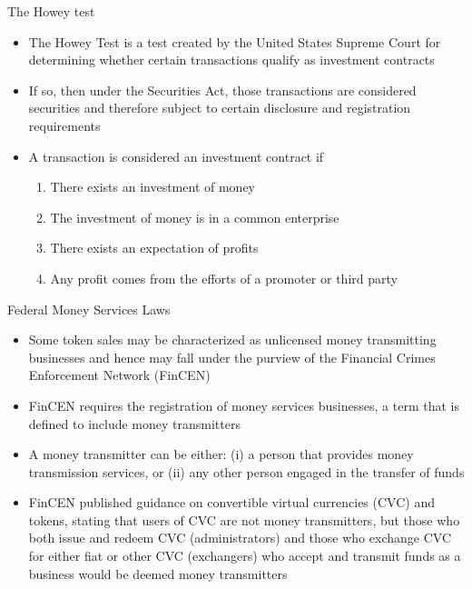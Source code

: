 \documentclass[10pt]{beamer}
\begin{document}

\begin{frame}{The Howey test}
	\begin{itemize}
		\item The Howey Test is a test created by the United States Supreme Court for determining whether certain transactions qualify as investment contracts
		\item If so, then under the Securities Act, those transactions are considered securities and therefore subject to certain disclosure and registration requirements
		\item A transaction is considered an investment contract if
		\begin{enumerate}
			\item There exists an investment of money
			\item The investment of money is in a common enterprise
			\item There exists an expectation of profits
			\item Any profit comes from the efforts of a promoter or third party
		\end{enumerate}
	\end{itemize}
\end{frame}



\begin{frame}{Federal Money Services Laws}
	\begin{itemize}
		\item Some token sales may be characterized as unlicensed money transmitting businesses and hence may fall under the purview of the Financial Crimes Enforcement Network (FinCEN)
		\item FinCEN requires the registration of money services businesses, a term that is defined to include money transmitters
		\item A money transmitter can be either: (i) a person that provides money transmission services, or (ii) any other person engaged in the transfer of funds
		\item FinCEN published guidance on convertible virtual currencies (CVC) and tokens, stating that users of CVC are not money transmitters, but those who both issue and redeem CVC (administrators) and those who exchange CVC for either fiat or other CVC (exchangers) who accept and transmit funds as a business would be deemed money transmitters
	\end{itemize}
\end{frame}
\end{document}

